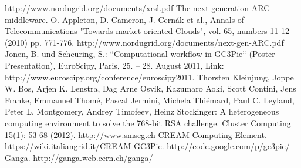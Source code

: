 \documentclass{PoS}
\begin{document}
\begin{thebibliography}{99}
   http://www.nordugrid.org/documents/xrsl.pdf
   The next-generation ARC middleware. O. Appleton,
    D. Cameron, J. Cernák et al., Annals of Telecommunications
    "Towards market-oriented Clouds", vol. 65, numbers 11-12 (2010)
    pp. 771-776. http://www.nordugrid.org/documents/next-gen-ARC.pdf
   Jonen, B. und Scheuring, S.:
    ``Computational workflow in GC3Pie“ (Poster Presentation),
    EuroScipy, Paris, 25. – 28. August 2011, Link:
    http://www.euroscipy.org/conference/euroscipy2011.
   Thorsten Kleinjung, Joppe W. Bos, Arjen
    K. Lenstra, Dag Arne Osvik, Kazumaro Aoki, Scott Contini, Jens
    Franke, Emmanuel Thomé, Pascal Jermini, Michela Thiémard, Paul
    C. Leyland, Peter L. Montgomery, Andrey Timofeev, Heinz
    Stockinger: A heterogeneous computing environment to solve the
    768-bit RSA challenge. Cluster Computing 15(1): 53-68 (2012).
   http://www.smscg.ch
   CREAM Computing
    Element. https://wiki.italiangrid.it/CREAM
   GC3Pie. http://code.google.com/p/gc3pie/
   Ganga. http://ganga.web.cern.ch/ganga/
\end{thebibliography}
\end{document}
